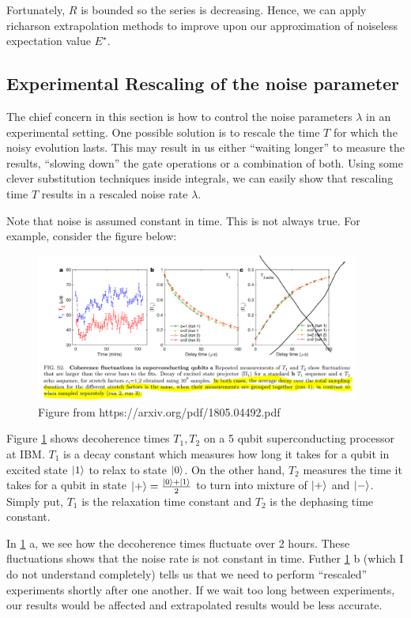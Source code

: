 \documentclass{article}
\begin{document}
Fortunately, \(R\) is bounded so the series is decreasing. Hence, we can apply
richarson extrapolation methods to improve upon our approximation of noiseless
expectation value \(E^\star\).
\subsection{Experimental Rescaling of the noise parameter}
The chief concern in this section is how to control the noise
parameters \(\lambda\) in an experimental setting. One possible solution
is to rescale the time \(T\) for which the noisy evolution lasts. This
may result in us either ``waiting longer'' to measure the results, ``slowing down''
the gate operations or a combination of both. Using some clever substitution techniques inside integrals,
we can easily show that rescaling time \(T\) results in a rescaled noise rate
 \(\lambda\).

 Note that noise is assumed constant in time. This is not always true. For example,
 consider the figure below:
 \begin{figure}[!htb]
	\centering
	\includegraphics[width=0.95\textwidth]{img/main-f791e832.png}
	\caption{ Figure from https://arxiv.org/pdf/1805.04492.pdf}
	\label{fig1}
\end{figure}
Figure \ref{fig1} shows decoherence times \(T_1, T_2\) on a 5 qubit superconducting
processor at IBM. \(T_1\) is a decay constant which measures how long it takes for a qubit
in excited state \(\ket{1}\) to relax to state \(\ket{0}\). On the other hand, \(T_2\)
measures the time it takes for a qubit in state \(\ket{+} = \frac{\ket{0}+ \ket{1}}{2}\) to turn into mixture of \(\ket{+}\) and \(\ket{-}\). Simply put,
\(T_1\) is the relaxation time constant and \(T_2\) is the dephasing time constant.

In \ref{fig1} a, we see how the decoherence times fluctuate over 2 hours. These
fluctuations shows that the noise rate is not constant in time. Futher \ref{fig1} b
(which I do not understand completely) tells us that we need to perform ``rescaled''
experiments shortly after one another. If we wait too long between experiments,
our results would be affected and extrapolated results would be less accurate.
\end{document}
